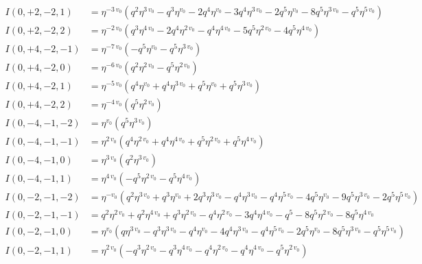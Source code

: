 \documentclass[11pt,a4paper]{article}
\begin{document}
\begin{align*}
I(0, +2, -2, 1) &= \eta^{-3 \, v_{0}} \left( q^{2} \eta^{3 \, v_{0}} - q^{3} \eta^{v_{0}} - 2 q^{4} \eta^{v_{0}} - 3 q^{4} \eta^{3 \, v_{0}} - 2 q^{5} \eta^{v_{0}} - 8 q^{5} \eta^{3 \, v_{0}} - q^{5} \eta^{5 \, v_{0}} \right) \\
I(0, +2, -2, 2) &= \eta^{-2 \, v_{0}} \left( q^{3} \eta^{4 \, v_{0}} - 2 q^{4} \eta^{2 \, v_{0}} - q^{4} \eta^{4 \, v_{0}} - 5 q^{5} \eta^{2 \, v_{0}} - 4 q^{5} \eta^{4 \, v_{0}} \right) \\
I(0, +4, -2, -1) &= \eta^{-7 \, v_{0}} \left( -q^{5} \eta^{v_{0}} - q^{5} \eta^{3 \, v_{0}} \right) \\
I(0, +4, -2, 0) &= \eta^{-6 \, v_{0}} \left( q^{2} \eta^{2 \, v_{0}} - q^{5} \eta^{2 \, v_{0}} \right) \\
I(0, +4, -2, 1) &= \eta^{-5 \, v_{0}} \left( q^{4} \eta^{v_{0}} + q^{4} \eta^{3 \, v_{0}} + q^{5} \eta^{v_{0}} + q^{5} \eta^{3 \, v_{0}} \right) \\
I(0, +4, -2, 2) &= \eta^{-4 \, v_{0}} \left( q^{5} \eta^{2 \, v_{0}} \right) \\
I(0, -4, -1, -2) &= \eta^{v_{0}} \left( q^{5} \eta^{3 \, v_{0}} \right) \\
I(0, -4, -1, -1) &= \eta^{2 \, v_{0}} \left( q^{4} \eta^{2 \, v_{0}} + q^{4} \eta^{4 \, v_{0}} + q^{5} \eta^{2 \, v_{0}} + q^{5} \eta^{4 \, v_{0}} \right) \\
I(0, -4, -1, 0) &= \eta^{3 \, v_{0}} \left( q^{2} \eta^{3 \, v_{0}} \right) \\
I(0, -4, -1, 1) &= \eta^{4 \, v_{0}} \left( -q^{5} \eta^{2 \, v_{0}} - q^{5} \eta^{4 \, v_{0}} \right) \\
I(0, -2, -1, -2) &= \eta^{-v_{0}} \left( q^{2} \eta^{3 \, v_{0}} + q^{3} \eta^{v_{0}} + 2 q^{3} \eta^{3 \, v_{0}} - q^{4} \eta^{3 \, v_{0}} - q^{4} \eta^{5 \, v_{0}} - 4 q^{5} \eta^{v_{0}} - 9 q^{5} \eta^{3 \, v_{0}} - 2 q^{5} \eta^{5 \, v_{0}} \right) \\
I(0, -2, -1, -1) &= q^{2} \eta^{2 \, v_{0}} + q^{2} \eta^{4 \, v_{0}} + q^{3} \eta^{2 \, v_{0}} - q^{4} \eta^{2 \, v_{0}} - 3 q^{4} \eta^{4 \, v_{0}} - q^{5} - 8 q^{5} \eta^{2 \, v_{0}} - 8 q^{5} \eta^{4 \, v_{0}} \\
I(0, -2, -1, 0) &= \eta^{v_{0}} \left( q \eta^{3 \, v_{0}} - q^{3} \eta^{3 \, v_{0}} - q^{4} \eta^{v_{0}} - 4 q^{4} \eta^{3 \, v_{0}} - q^{4} \eta^{5 \, v_{0}} - 2 q^{5} \eta^{v_{0}} - 8 q^{5} \eta^{3 \, v_{0}} - q^{5} \eta^{5 \, v_{0}} \right) \\
I(0, -2, -1, 1) &= \eta^{2 \, v_{0}} \left( -q^{3} \eta^{2 \, v_{0}} - q^{3} \eta^{4 \, v_{0}} - q^{4} \eta^{2 \, v_{0}} - q^{4} \eta^{4 \, v_{0}} - q^{5} \eta^{2 \, v_{0}} \right) \\

\end{align*}
\end{document}
